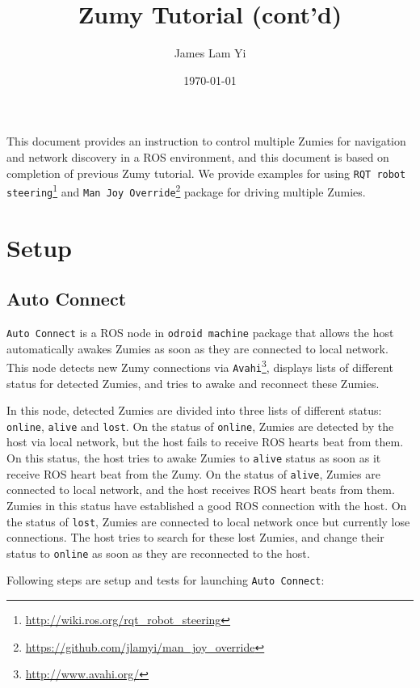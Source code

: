 \documentclass{article}
\begin{document}
\title{Zumy Tutorial (cont'd)}
\author{James Lam Yi}
\date{\today}
\maketitle
This document provides an instruction to control multiple Zumies for navigation and network discovery in a ROS environment, and this document is based on completion of previous Zumy tutorial. We provide examples for using \verb=RQT robot steering=\footnote{\url{http://wiki.ros.org/rqt_robot_steering}} and \verb=Man Joy Override=\footnote{\url{https://github.com/jlamyi/man_joy_override}} package for driving multiple Zumies. 

\section{Setup}
\subsection{Auto Connect}
\verb=Auto Connect= is a ROS node in \verb=odroid machine= package that allows the host automatically awakes Zumies as soon as they are connected to local network. This node detects new Zumy connections via \verb=Avahi=\footnote{\url{http://www.avahi.org/}}, displays lists of different status for detected Zumies, and tries to awake and reconnect these Zumies. 

In this node, detected Zumies are divided into three lists of different status: \verb=online=, \verb=alive= and \verb=lost=.  On the status of \verb=online=, Zumies are detected by the host via local network, but the host fails to receive ROS hearts beat from them. On this status, the host tries to awake Zumies to \verb=alive= status as soon as it receive ROS heart beat from the Zumy. On the status of \verb=alive=, Zumies are connected to local network, and the host receives ROS heart beats from them. Zumies in this status have established a good ROS connection with the host. On the status of \verb=lost=, Zumies are connected to local network once but currently lose connections. The host tries to search for these lost Zumies, and change their status to \verb=online= as soon as they are reconnected to the host.

Following steps are setup and tests for launching \verb=Auto Connect=:
 
\end{document}
